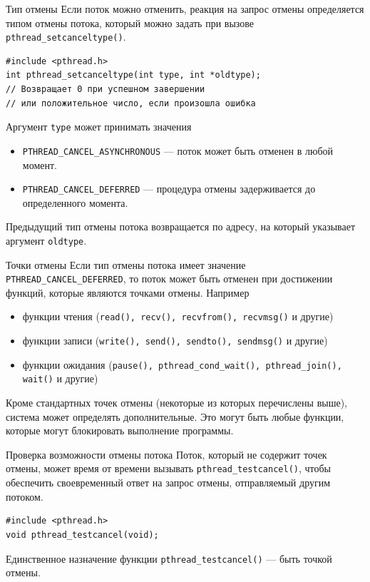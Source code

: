 \documentclass{beamer}
\begin{document}
\begin{frame}[fragile]{Тип отмены}
    Если поток можно отменить, реакция на запрос отмены определяется типом отмены потока, который можно задать при вызове \texttt{pthread\_setcanceltype()}.
    \begin{verbatim}
#include <pthread.h>
int pthread_setcanceltype(int type, int *oldtype);
// Возвращает 0 при успешном завершении 
// или положительное число, если произошла ошибка
    \end{verbatim}
    
    Аргумент \texttt{type} может принимать значения
    \begin{itemize}
        \item \texttt{PTHREAD\_CANCEL\_ASYNCHRONOUS} — поток может быть отменен в любой момент.
        \item \texttt{PTHREAD\_CANCEL\_DEFERRED} — процедура отмены задерживается до определенного момента.
    \end{itemize}
    
    Предыдущий тип отмены потока возвращается по адресу, на который указывает аргумент \texttt{oldtype}.
\end{frame}

\begin{frame}{Точки отмены}
    Если тип отмены потока имеет значение \texttt{PTHREAD\_CANCEL\_DEFERRED}, то поток может быть отменен при достижении функций, которые являются точками отмены. Например
    \begin{itemize}
        \item функции чтения (\texttt{read(), recv(), recvfrom(), recvmsg()} и другие)
        \item функции записи (\texttt{write(), send(), sendto(), sendmsg()} и другие)
        \item функции ожидания (\texttt{pause(), pthread\_cond\_wait(), pthread\_join(), wait()} и другие)
    \end{itemize}
    
    Кроме стандартных точек отмены (некоторые из которых перечислены выше), система может определять дополнительные. Это могут быть любые функции, которые могут блокировать выполнение программы.
\end{frame}

\begin{frame}[fragile]{Проверка возможности отмены потока}
    Поток, который не содержит точек отмены, может время от времени вызывать \texttt{pthread\_testcancel()}, чтобы обеспечить своевременный ответ на запрос отмены, отправляемый другим потоком.
    \begin{verbatim}
#include <pthread.h>
void pthread_testcancel(void);
    \end{verbatim}
    
    Единственное назначение функции \texttt{pthread\_testcancel()} — быть точкой отмены.
\end{frame}
\end{document}
